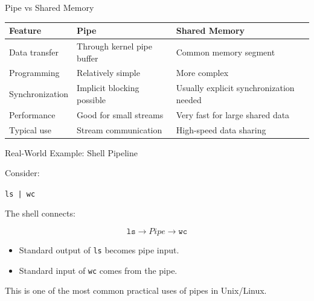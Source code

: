 \documentclass[aspectratio=169]{beamer}
\begin{document}
\begin{frame}{Pipe vs Shared Memory}

\begin{center}
\begin{tabular}{|p{3.5cm}|p{4cm}|p{4cm}|}
\hline
\textbf{Feature} &
\textbf{Pipe} &
\textbf{Shared Memory}
\\
\hline

Data transfer &
Through kernel pipe buffer &
Common memory segment
\\
\hline

Programming &
Relatively simple &
More complex
\\
\hline

Synchronization &
Implicit blocking possible &
Usually explicit synchronization needed
\\
\hline

Performance &
Good for small streams &
Very fast for large shared data
\\
\hline

Typical use &
Stream communication &
High-speed data sharing
\\
\hline

\end{tabular}
\end{center}

\end{frame}

\begin{frame}{Real-World Example: Shell Pipeline}

Consider:

\begin{center}
\Large
\texttt{ls | wc}
\end{center}

The shell connects:

\[
\texttt{ls}
\rightarrow
Pipe
\rightarrow
\texttt{wc}
\]

\begin{itemize}
    \item Standard output of \texttt{ls} becomes pipe input.
    \item Standard input of \texttt{wc} comes from the pipe.
\end{itemize}

This is one of the most common practical uses of pipes in Unix/Linux.

\end{frame}
\end{document}
